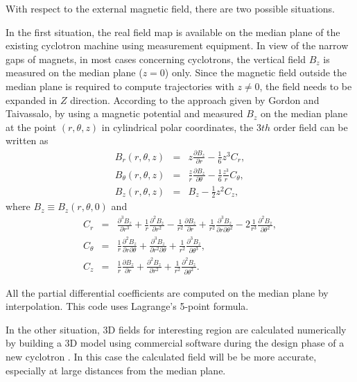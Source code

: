 \documentclass[aps,prstab,twocolumn,superscriptaddress]{revtex4}
\begin{document}
With respect to the external magnetic field, there are two possible situations. 

In the first situation, the real field map is available on the median plane of the existing cyclotron machine using measurement equipment.
In view of the narrow gaps of magnets, in most cases concerning cyclotrons, the vertical field $B_z$ is measured on the median plane ($z=0$) only.
Since the magnetic field outside the median plane is required to compute trajectories with $z \neq 0$, the field needs to be expanded in $Z$ direction. 
According to the approach given by Gordon and Taivassalo\cite{Gordon:2}, by using a magnetic potential and measured $B_z$ on the median plane
at the point $(r,\theta, z)$ in cylindrical polar coordinates, the 3$th$ order field can be written as    
\begin{eqnarray}\label{eq:Bfield}
  B_r(r,\theta, z) & = & z\frac{\partial B_z}{\partial r}-\frac{1}{6}z^3 C_r, \nonumber\\    
  B_\theta(r,\theta, z) & = & \frac{z}{r}\frac{\partial B_z}{\partial \theta}-\frac{1}{6}\frac{z^3}{r} C_{\theta}, \\     
  B_z(r,\theta, z) & = & B_z-\frac{1}{2}z^2 C_z,  \nonumber    
\end{eqnarray}
where $B_z\equiv B_z(r, \theta, 0)$ and  
\begin{eqnarray}\label{eq:Bcoeff}
  C_r & = & \frac{\partial^3B_z}{\partial r^3} + \frac{1}{r}\frac{\partial^2 B_z}{\partial r^2} - \frac{1}{r^2}\frac{\partial B_z}{\partial r} 
        + \frac{1}{r^2}\frac{\partial^3 B_z}{\partial r \partial \theta^2} - 2\frac{1}{r^3}\frac{\partial^2 B_z}{\partial \theta^2}, \nonumber  \\    
  C_{\theta} & = & \frac{1}{r}\frac{\partial^2 B_z}{\partial r \partial \theta} + \frac{\partial^3 B_z}{\partial r^2 \partial \theta}
        + \frac{1}{r^2}\frac{\partial^3 B_z}{\partial \theta^3},  \\
  C_z & = & \frac{1}{r}\frac{\partial B_z}{\partial r} + \frac{\partial^2 B_z}{\partial r^2} + \frac{1}{r^2}\frac{\partial^2 B_z}{\partial \theta^2}. \nonumber
\end{eqnarray}

All the partial differential coefficients are computed on the median plane by interpolation. This code uses Lagrange's 5-point formula.

In the other situation, 3D fields for interesting region are calculated numerically by building a 3D model using commercial software 
during the design phase of a new cyclotron . In this case the calculated field will be be more accurate, especially at large distances from the median plane.
\end{document}
